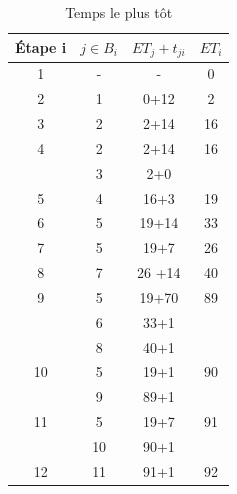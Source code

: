 \documentclass{article}
\begin{document}
\begin{table}[H]
    \caption{Temps le plus tôt} \label{tab:Temps le plus tot}
    \begin{center}
        \begin{tabular}{|c|c|c|c|}
            \hline
            Étape i & $j \in B_i$ & $ET_j+t_{ji}$ & $ET_i$ \\
            \hline
            1        & -           & -             & 0      \\
            2        & 1          & 0+12          & 2      \\
            3        & 2          & 2+14          & 16     \\
            4        & 2          & 2+14          & 16     \\
                     & 3          & 2+0           &        \\
            5        & 4           & 16+3          & 19     \\
            6        & 5           & 19+14         & 33     \\
            7        & 5           & 19+7          & 26     \\
            8        & 7           & 26 +14        & 40     \\
            9        & 5           & 19+70         & 89     \\
                     & 6          & 33+1          &        \\
                     & 8          & 40+1          &        \\
            10       & 5           & 19+1          & 90     \\
                     & 9           & 89+1          &        \\
            11       & 5           & 19+7          & 91     \\
                     & 10           & 90+1          &        \\
            12       & 11           & 91+1          & 92     \\
            \hline
                                                     
                        
                                        
        \end{tabular}
    \end{center}
\end{table}
\end{document}
